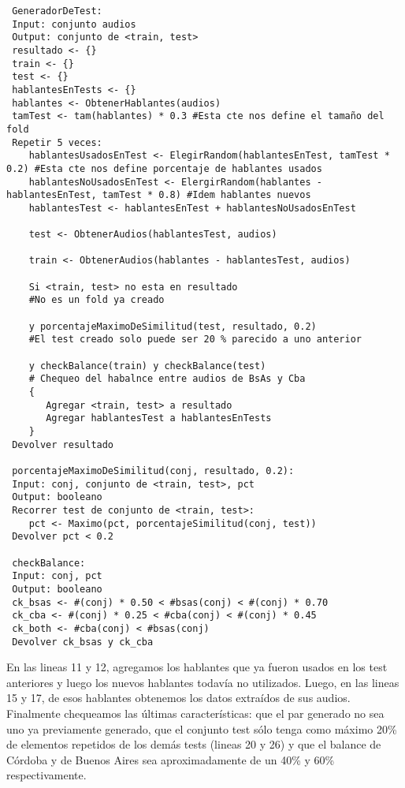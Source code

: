 \begin{lstlisting}
 GeneradorDeTest:
 Input: conjunto audios
 Output: conjunto de <train, test>
 resultado <- {} 
 train <- {}
 test <- {}
 hablantesEnTests <- {}
 hablantes <- ObtenerHablantes(audios)
 tamTest <- tam(hablantes) * 0.3 #Esta cte nos define el tamaño del fold
 Repetir 5 veces:
    hablantesUsadosEnTest <- ElegirRandom(hablantesEnTest, tamTest * 0.2) #Esta cte nos define porcentaje de hablantes usados
    hablantesNoUsadosEnTest <- ElergirRandom(hablantes - hablantesEnTest, tamTest * 0.8) #Idem hablantes nuevos
    hablantesTest <- hablantesEnTest + hablantesNoUsadosEnTest

    test <- ObtenerAudios(hablantesTest, audios)

    train <- ObtenerAudios(hablantes - hablantesTest, audios)

    Si <train, test> no esta en resultado 
    #No es un fold ya creado
    
    y porcentajeMaximoDeSimilitud(test, resultado, 0.2) 
    #El test creado solo puede ser 20 % parecido a uno anterior
    
    y checkBalance(train) y checkBalance(test)
    # Chequeo del habalnce entre audios de BsAs y Cba
    {
       Agregar <train, test> a resultado
       Agregar hablantesTest a hablantesEnTests
    }
 Devolver resultado
    
 porcentajeMaximoDeSimilitud(conj, resultado, 0.2):
 Input: conj, conjunto de <train, test>, pct
 Output: booleano
 Recorrer test de conjunto de <train, test>:
    pct <- Maximo(pct, porcentajeSimilitud(conj, test))
 Devolver pct < 0.2	

 checkBalance:
 Input: conj, pct
 Output: booleano
 ck_bsas <- #(conj) * 0.50 < #bsas(conj) < #(conj) * 0.70
 ck_cba <- #(conj) * 0.25 < #cba(conj) < #(conj) * 0.45
 ck_both <- #cba(conj) < #bsas(conj)
 Devolver ck_bsas y ck_cba
\end{lstlisting}

En las lineas 11 y 12, agregamos los hablantes que ya fueron usados en los test anteriores y luego los nuevos hablantes todavía no utilizados. Luego, en las lineas 15 y 17, de esos hablantes obtenemos los datos extraídos de sus audios. Finalmente chequeamos las últimas características: que el par generado no sea uno ya previamente generado, que el conjunto test sólo tenga como máximo 20\% de elementos repetidos de los demás tests (lineas 20 y 26) y que el balance de Córdoba y de Buenos Aires sea aproximadamente de un 40\% y 60\% respectivamente.

